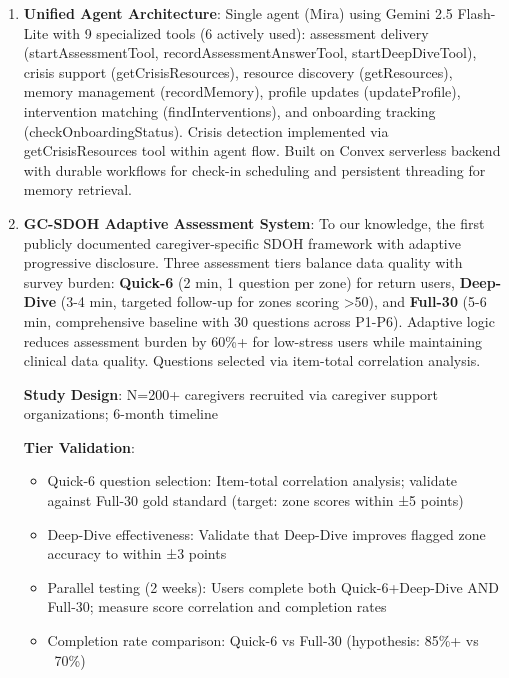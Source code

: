 \documentclass{article}
\begin{document}
\begin{enumerate}
    \item \textbf{Unified Agent Architecture}: Single agent (Mira) using Gemini 2.5 Flash-Lite with 9 specialized tools (6 actively used): assessment delivery (startAssessmentTool, recordAssessmentAnswerTool, startDeepDiveTool), crisis support (getCrisisResources), resource discovery (getResources), memory management (recordMemory), profile updates (updateProfile), intervention matching (findInterventions), and onboarding tracking (checkOnboardingStatus). Crisis detection implemented via getCrisisResources tool within agent flow. Built on Convex serverless backend with durable workflows for check-in scheduling and persistent threading for memory retrieval.

    \item \textbf{GC-SDOH Adaptive Assessment System}: To our knowledge, the first publicly documented caregiver-specific SDOH framework with adaptive progressive disclosure. Three assessment tiers balance data quality with survey burden: \textbf{Quick-6} (2 min, 1 question per zone) for return users, \textbf{Deep-Dive} (3-4 min, targeted follow-up for zones scoring >50), and \textbf{Full-30} (5-6 min, comprehensive baseline with 30 questions across P1-P6). Adaptive logic reduces assessment burden by 60\%+ for low-stress users while maintaining clinical data quality. Questions selected via item-total correlation analysis.

\begin{tcolorbox}[colback=gcTan!20!white,colframe=gcOrange,title=\textbf{GC-SDOH Adaptive Validation Roadmap (Required Before Clinical Use)},boxrule=1.5pt]
\textbf{Study Design}: N=200+ caregivers recruited via caregiver support organizations; 6-month timeline

\textbf{Tier Validation}:
\begin{itemize}[nosep,leftmargin=1em]
    \item Quick-6 question selection: Item-total correlation analysis; validate against Full-30 gold standard (target: zone scores within ±5 points)
    \item Deep-Dive effectiveness: Validate that Deep-Dive improves flagged zone accuracy to within ±3 points
    \item Parallel testing (2 weeks): Users complete both Quick-6+Deep-Dive AND Full-30; measure score correlation and completion rates
    \item Completion rate comparison: Quick-6 vs Full-30 (hypothesis: 85\%+ vs ~70\%)
\end{itemize}


\end{tcolorbox}
\end{enumerate}
\end{document}
